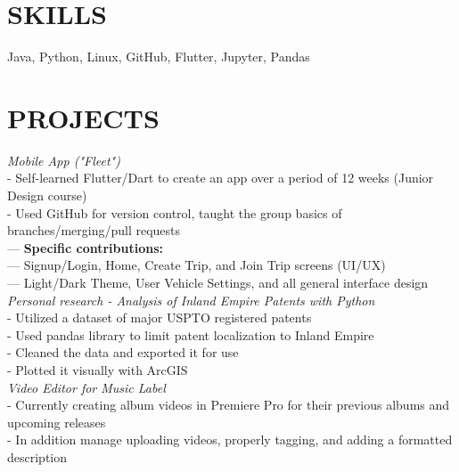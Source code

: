 \documentclass[line,margin]{res}
\begin{document}
\address{jonahbrawley@gmail.com}
\address{github.com/jonahbrawley}
\address{linkedin.com/in/jonahbrawley}
\begin{resume}

                    
\section{SKILLS}
                    Java, Python, Linux, GitHub, Flutter, Jupyter, Pandas

\section{PROJECTS}
                    {\sl Mobile App ("Fleet")}\\
                    - Self-learned Flutter/Dart to create an app over a period of 12 weeks (Junior Design course)\\
                    - Used GitHub for version control, taught the group basics of branches/merging/pull requests\\
                    --- {\bf Specific contributions:}\\
                    --- Signup/Login, Home, Create Trip, and Join Trip screens (UI/UX)\\
                    --- Light/Dark Theme, User Vehicle Settings, and all general interface design\\

                    {\sl Personal research - Analysis of Inland Empire Patents with Python} \\
                    - Utilized a dataset of major USPTO registered patents\\
                    - Used pandas library to limit patent localization to Inland Empire\\
                    - Cleaned the data and exported it for use\\
                    - Plotted it visually with ArcGIS\\

                    {\sl Video Editor for Music Label} \\
                    - Currently creating album videos in Premiere Pro for their previous albums and upcoming releases\\
                    - In addition manage uploading videos, properly tagging, and adding a formatted description\\


\end{resume}
\end{document}
